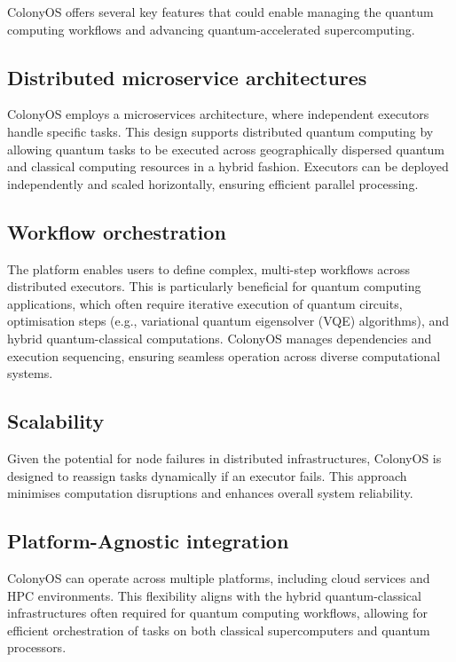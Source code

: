 \documentclass{article}
\begin{document}
ColonyOS offers several key features that could enable managing the quantum computing workflows and advancing quantum-accelerated supercomputing.

\subsection{Distributed microservice architectures}\label{subsec:microservices}

ColonyOS employs a microservices architecture, where independent executors handle specific tasks. This design supports distributed quantum computing by allowing quantum tasks to be executed across geographically dispersed quantum and classical computing resources in a hybrid fashion. Executors can be deployed independently and scaled horizontally, ensuring efficient parallel processing.

\subsection{Workflow orchestration}\label{subsec:orchestration}

The platform enables users to define complex, multi-step workflows across distributed executors. This is particularly beneficial for quantum computing applications, which often require iterative execution of quantum circuits, optimisation steps (e.g., variational quantum eigensolver (VQE) algorithms), and hybrid quantum-classical computations. ColonyOS manages dependencies and execution sequencing, ensuring seamless operation across diverse computational systems.

\subsection{Scalability}\label{subsec:scalability}

Given the potential for node failures in distributed infrastructures, ColonyOS is designed to reassign tasks dynamically if an executor fails. This approach minimises computation disruptions and enhances overall system reliability.

\subsection{Platform-Agnostic integration}\label{subsec:integration}

ColonyOS can operate across multiple platforms, including cloud services and HPC environments. This flexibility aligns with the hybrid quantum-classical infrastructures often required for quantum computing workflows, allowing for efficient orchestration of tasks on both classical supercomputers and quantum processors.
\end{document}
